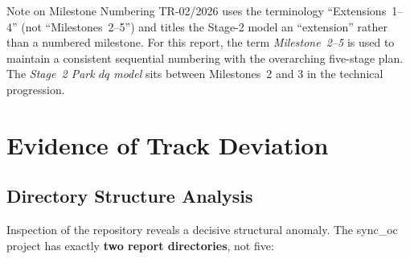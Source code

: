 \documentclass[12pt,a4paper]{article}
\begin{document}
\begin{findingbox}{Note on Milestone Numbering}
TR-02/2026 uses the terminology ``Extensions~1--4'' (not ``Milestones~2--5'')
and titles the Stage-2 model an ``extension'' rather than a numbered milestone.
For this report, the term \emph{Milestone~2--5} is used to maintain a consistent
sequential numbering with the overarching five-stage plan.  The \emph{Stage~2
Park $dq$ model} sits between Milestones~2 and 3 in the technical progression.
\end{findingbox}


\section{Evidence of Track Deviation}
\label{sec:evidence}

\subsection{Directory Structure Analysis}
\label{sec:ev:dir}

Inspection of the repository reveals a decisive structural anomaly.  The sync\_oc
project has exactly \textbf{two report directories}, not five:
\end{document}
